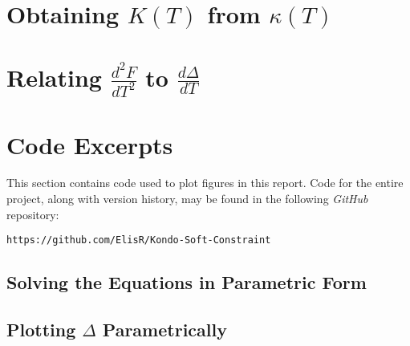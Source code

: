 
\section{Obtaining $ K(T) $ from $ \kappa(T) $}

\section{Relating $ \frac{d^2 F}{d T^2} $ to $ \frac{d \Delta}{d T} $}


\section{Code Excerpts}
\label{sec:code}

This section contains code used to plot figures in this report. Code for the entire project, along with version history, may be found in the following \textit{GitHub} repository:

\begin{center}
\texttt{https://github.com/ElisR/Kondo-Soft-Constraint}
\end{center}

\subsection{Solving the Equations in Parametric Form}

\subsection{Plotting $ \Delta $ Parametrically}
